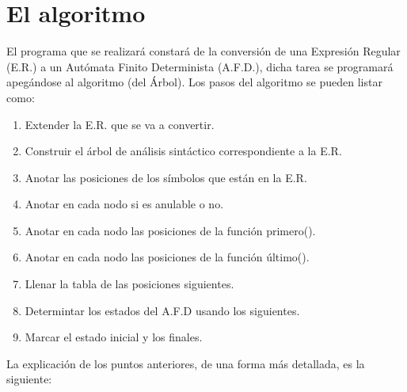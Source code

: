 \documentclass{report}
\begin{document}
\section{El algoritmo}
El programa que se realizará constará de la conversión de una Expresión Regular (E.R.) a un Autómata Finito Determinista (A.F.D.), dicha tarea se programará apegándose al algoritmo (del Árbol).
Los pasos del algoritmo se pueden listar como:
\begin{enumerate}
	\item Extender la E.R. que se va a convertir.
	\item Construir el árbol de análisis sintáctico correspondiente a la E.R.
	\item Anotar las posiciones de los símbolos que están en la E.R.
	\item Anotar en cada nodo si es anulable o no.
	\item Anotar en cada nodo las posiciones de la función primero().
	\item Anotar en cada nodo las posiciones de la función último().
	\item Llenar la tabla de las posiciones siguientes.
	\item Determintar los estados del A.F.D usando los siguientes.
	\item Marcar el estado inicial y los finales.
\end{enumerate}
La explicación de los puntos anteriores, de una forma más detallada, es la siguiente:
\end{document}
